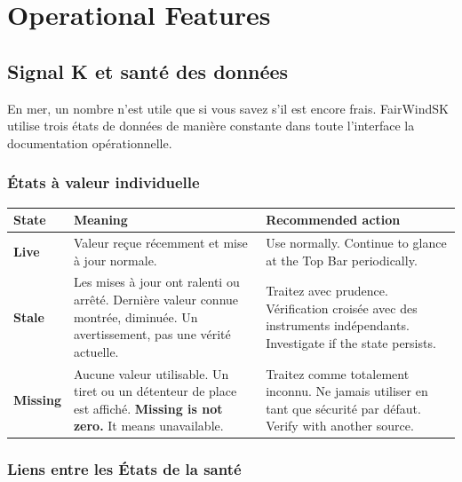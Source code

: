 \part{Operational Features}

\chapter{Signal K et santé des données}
\label{ch:datahealth}

En mer, un nombre n'est utile que si vous savez s'il est encore frais.
FairWindSK utilise trois états de données de manière constante dans toute l'interface
la documentation opérationnelle.

\section{États à valeur individuelle}

\begin{longtable}{L{2.2cm}L{5.4cm}L{6.1cm}}
\toprule
{}
\color{white}\sffamily\bfseries State &
\color{white}\sffamily\bfseries Meaning &
\color{white}\sffamily\bfseries Recommended action \\
\midrule
\textbf{Live}    &
Valeur reçue récemment et mise à jour normale.&
  Use normally. Continue to glance at the Top Bar periodically. \\
\textbf{Stale}   &
Les mises à jour ont ralenti ou arrêté. Dernière valeur connue montrée, diminuée.
Un avertissement, pas une vérité actuelle.&
Traitez avec prudence. Vérification croisée avec des instruments indépendants.
  Investigate if the state persists. \\
\textbf{Missing} &
Aucune valeur utilisable. Un tiret ou un détenteur de place est affiché.
  \textbf{Missing is not zero.} It means unavailable. &
Traitez comme totalement inconnu. Ne jamais utiliser en tant que sécurité par défaut.
  Verify with another source. \\
\bottomrule
\end{longtable}

\section{Liens entre les États de la santé}


